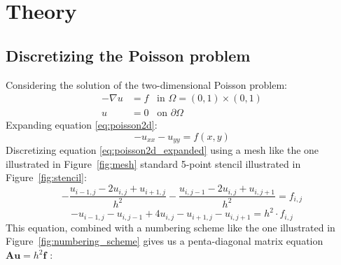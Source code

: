 
\section{Theory} %

\subsection{Discretizing the Poisson problem}
\label{sec:discretizing_the_poisson_problem}
Considering the solution of the two-dimensional Poisson problem:
\begin{align}
  - \nabla u &= f \;\;\; \text{in } \Omega = (0,1) \times (0,1) \label{eq:poisson2d} \\
  u &= 0 \;\;\; \text{on } \partial \Omega \label{eq:poisson2d_edge}
\end{align}
Expanding equation \eqref{eq:poisson2d}:
\begin{equation}
  -u_{xx} - u_{yy} = f(x,y) \label{eq:poisson2d_expanded}
\end{equation}
Discretizing equation \eqref{eq:poisson2d_expanded} using a mesh like the one illustrated in Figure~\ref{fig:mesh} standard 5-point stencil illustrated in Figure~\ref{fig:stencil}:
\begin{equation}
  \nonumber
  - \frac{u_{i-1,j} - 2u_{i,j} + u_{i+1,j}}{h^2} - \frac{u_{i,j-1} - 2u_{i,j} + u_{i,j+1}}{h^2} = f_{i,j}
\end{equation}
\begin{equation}
  -u_{i-1,j} -u_{i,j-1} + 4u_{i,j} - u_{i+1,j} - u_{i,j+1} = h^2 \cdot f_{i,j}
\end{equation}
This equation, combined with a numbering scheme like the one illustrated in Figure~\ref{fig:numbering_scheme} gives us a penta-diagonal matrix equation $\mathbf{Au}=h^2\mathbf{f}$ :
